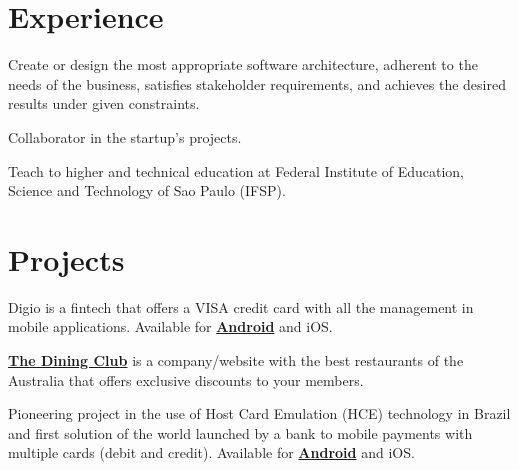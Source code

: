 \documentclass[]{resume}
\begin{document}
\hfill
\begin{minipage}[t]{0.66\textwidth} 


\section{Experience}
Create or design the most appropriate software architecture, adherent to the needs of the business, satisfies stakeholder requirements, and achieves the desired results under given constraints.
\sectionsep

Collaborator in the startup's projects.
\sectionsep

Teach to higher and technical education at Federal Institute of Education, Science and Technology of Sao Paulo (IFSP).
\sectionsep


\section{Projects}

Digio is a fintech that offers a VISA credit card with all the management in mobile applications. Available for \textbf{\href{https://goo.gl/zvebsh}{Android}} and iOS.
\sectionsep

\textbf{\href{https://www.thediningclub.com.au}{The Dining Club}} is a company/website with the best restaurants of the Australia that offers exclusive discounts to your members.
\sectionsep

Pioneering project in the use of Host Card Emulation (HCE) technology in Brazil and first solution of the world launched by a bank to mobile payments with multiple cards (debit and credit). Available for \textbf{\href{https://goo.gl/T7oLwj}{Android}} and iOS.
\sectionsep


\end{minipage}
\end{document}
